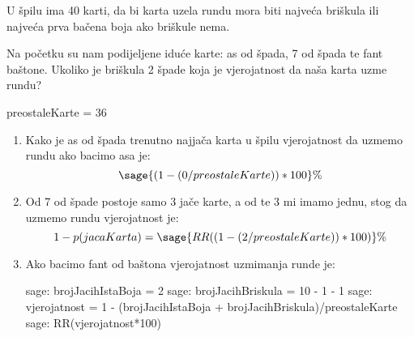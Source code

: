 \documentclass{article}
\begin{document}
U špilu ima 40 karti, da bi karta uzela rundu mora biti najveća briškula ili najveća prva bačena boja ako briškule nema.

Na početku su nam podijeljene iduće karte: as od špada, 7 od špada te fant baštone.
Ukoliko je briškula 2 špade koja je vjerojatnost da naša karta uzme rundu? \newline

\begin{sageblock}
            preostaleKarte = 36
\end{sageblock}

\begin{enumerate}
    \item Kako je as od špada trenutno najjača karta u špilu vjerojatnost da uzmemo rundu ako bacimo asa je:      $$\sage{(1 - (0/preostaleKarte))*100}\%$$
    
    \item Od 7 od špade postoje samo 3 jače karte, a od te 3 mi imamo jednu, stog da uzmemo rundu vjerojatnost je:    $$ 1 - p(jacaKarta) = \sage{ RR((1-(2/preostaleKarte))*100) } \% $$
    
    \item Ako bacimo fant od baštona vjerojatnost uzmimanja runde je:
        \begin{sagecommandline}
            sage: brojJacihIstaBoja = 2
            sage: brojJacihBriskula = 10 - 1 - 1
            sage: vjerojatnost = 1 - (brojJacihIstaBoja + brojJacihBriskula)/preostaleKarte
            sage: RR(vjerojatnost*100)
        \end{sagecommandline}
        
        
\end{enumerate}
\end{document}
